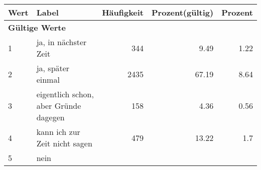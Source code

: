      \begin{longtable}{lXrrr}
     \toprule
     \textbf{Wert} & \textbf{Label} & \textbf{Häufigkeit} & \textbf{Prozent(gültig)} & \textbf{Prozent} \\
     \endhead
     \midrule
     \multicolumn{5}{l}{\textbf{Gültige Werte}}\\

     1 &
     \multicolumn{1}{X}{ ja, in nächster Zeit   } &


       \num{344} &
       \num[round-mode=places,round-precision=2]{9.49} &
         \num[round-mode=places,round-precision=2]{1.22} \\

     2 &
     \multicolumn{1}{X}{ ja, später einmal   } &


       \num{2435} &
       \num[round-mode=places,round-precision=2]{67.19} &
         \num[round-mode=places,round-precision=2]{8.64} \\

     3 &
     \multicolumn{1}{X}{ eigentlich schon, aber Gründe dagegen   } &


       \num{158} &
       \num[round-mode=places,round-precision=2]{4.36} &
         \num[round-mode=places,round-precision=2]{0.56} \\

     4 &
     \multicolumn{1}{X}{ kann ich zur Zeit nicht sagen   } &


       \num{479} &
       \num[round-mode=places,round-precision=2]{13.22} &
         \num[round-mode=places,round-precision=2]{1.7} \\

     5 &
     \multicolumn{1}{X}{ nein   } &



\end{longtable}
